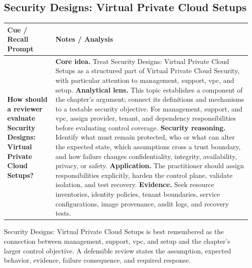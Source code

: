 \documentclass[11pt]{article}
\newcommand{\CornellHeader}{%
\rowcolor{Navy}\color{white}\bfseries Cue / Recall Prompt & \color{white}\bfseries Notes / Analysis\\\hline}
\newcommand{\CornellRow}[2]{%
\cellcolor{CueGray}\RaggedRight\textbf{#1} & \RaggedRight #2\\\hline}
\begin{document}
\subsection*{Security Designs: Virtual Private Cloud Setups}
\begin{longtable}{>{\RaggedRight\arraybackslash}p{}|>{\RaggedRight\arraybackslash}p{}}
\CornellHeader
\CornellRow{How should a reviewer evaluate Security Designs: Virtual Private Cloud Setups?}{\textbf{Core idea.} Treat Security Designs: Virtual Private Cloud Setups as a structured part of Virtual Private Cloud Security, with particular attention to management, support, vpc, and setup. \textbf{Analytical lens.} This topic establishes a component of the chapter's argument; connect its definitions and mechanisms to a testable security objective. For management, support, and vpc, assign provider, tenant, and dependency responsibilities before evaluating control coverage. \textbf{Security reasoning.} Identify what must remain protected, who or what can alter the expected state, which assumptions cross a trust boundary, and how failure changes confidentiality, integrity, availability, privacy, or safety. \textbf{Application.} The practitioner should assign responsibilities explicitly, harden the control plane, validate isolation, and test recovery. \textbf{Evidence.} Seek resource inventories, identity policies, tenant boundaries, service configurations, image provenance, audit logs, and recovery tests.}
\end{longtable}
\begin{topicsummary}
Security Designs: Virtual Private Cloud Setups is best remembered as the connection between management, support, vpc, and setup and the chapter's larger control objective. A defensible review states the assumption, expected behavior, evidence, failure consequence, and required response.
\end{topicsummary}
\end{document}
